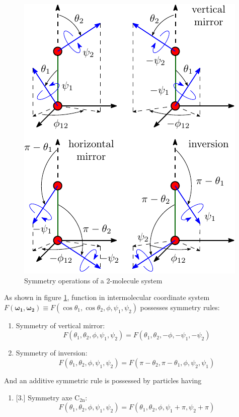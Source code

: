 \begin{figure}[h]
\begin{centering}
\includegraphics{_figure/symmetry_dcf}
\par\end{centering}

\caption{Symmetry operations of a 2-molecule system\label{fig:Symmetry-operations}}
\end{figure}


As shown in figure \ref{fig:Symmetry-operations}, function in intermolecular
coordinate system $F(\boldsymbol{\omega_{1}},\boldsymbol{\omega_{2}})\equiv F(\cos\theta_{1},\cos\theta_{2},\phi,\psi_{1},\psi_{2})$
possesses symmetry rules:
\begin{enumerate}
\item Symmetry of vertical mirror: 
\begin{equation}
F(\theta_{1},\theta_{2},\phi,\psi_{1},\psi_{2})=F(\theta_{1},\theta_{2},-\phi,-\psi_{1},-\psi_{2})
\end{equation}

\item Symmetry of inversion: 
\begin{equation}
F(\theta_{1},\theta_{2},\phi,\psi_{1},\psi_{2})=F(\pi-\theta_{2},\pi-\theta_{1},\phi,\psi_{2},\psi_{1})
\end{equation}

\end{enumerate}
And an additive symmetric rule is possessed by particles having 
\begin{enumerate}
\item {}%
[3.]%
Symmetry axe $\mathrm{C_{2n}}$: 
\begin{equation}
F(\theta_{1},\theta_{2},\phi,\psi_{1},\psi_{2})=F(\theta_{1},\theta_{2},\phi,\psi_{1}+\pi,\psi_{2}+\pi)
\end{equation}

\end{enumerate}

